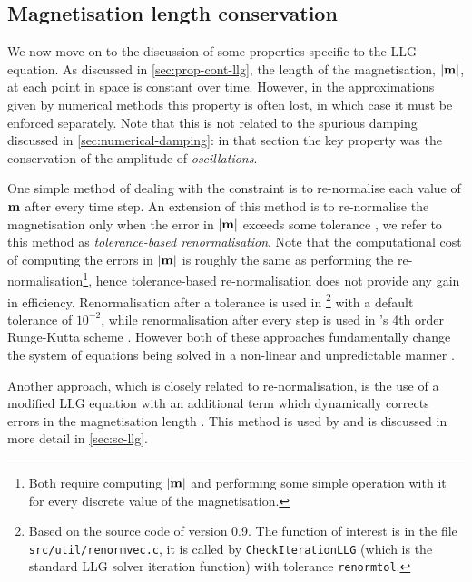 \subsection{Magnetisation length conservation}
\label{sec:ensuring-constant-mv}

We now move on to the discussion of some properties specific to the LLG equation.
As discussed in \cref{sec:prop-cont-llg}, the length of the magnetisation, $\left|{\boldsymbol{\mathrm{m}}} \right|$, at each point in space is constant over time.
However, in the approximations given by numerical methods this property is often lost, in which case it must be enforced separately.
Note that this is not related to the spurious damping discussed in \cref{sec:numerical-damping}: in that section the key property was the conservation of the amplitude of \emph{oscillations}.

\label{alt-ml-renorm-intro} %
One simple method of dealing with the constraint is to re-normalise each value of $\boldsymbol{\mathrm{m}}$ after every time step.
An extension of this method is to re-normalise the magnetisation only when the error in $\left|{\boldsymbol{\mathrm{m}}} \right|$ exceeds some tolerance \cite{Fidler2000}, we refer to this method as \emph{tolerance-based renormalisation}.
Note that the computational cost of computing the errors in $\left|{\boldsymbol{\mathrm{m}}} \right|$ is roughly the same as performing the re-normalisation\footnote{Both require computing $\left|{\boldsymbol{\mathrm{m}}} \right|$ and performing some simple operation with it for every discrete value of the magnetisation.}, hence tolerance-based re-normalisation does not provide any gain in efficiency.
Renormalisation after a tolerance is used in \magpar\footnote{Based on the source code of version 0.9. The function of interest is in the file \texttt{src/util/renormvec.c}, it is called by \texttt{CheckIterationLLG} (which is the standard LLG solver iteration function) with tolerance \texttt{renormtol}.} with a default tolerance of $10^{-2}$, while renormalisation after every step is used in \oommf's 4th order Runge-Kutta scheme \cite{fangor-donahue-email}.
However both of these approaches fundamentally change the system of equations being solved in a non-linear and unpredictable manner \cite{Lewis2003}.

Another approach, which is closely related to re-normalisation, is the use of a modified LLG equation with an additional term which dynamically corrects errors in the magnetisation length \cite{Porter2005} \cite{Fischbacher2009}.
This method is used by \nmag \cite{Fischbacher2009} and is discussed in more detail in \cref{sec:sc-llg}.

